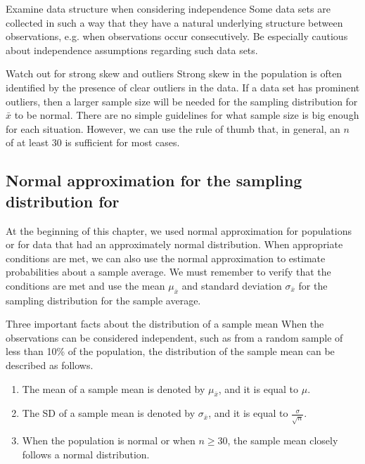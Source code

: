 \begin{onebox}{Examine data structure when considering independence}
{Some data sets are collected in such a way that they have a natural underlying structure between observations, e.g. when observations occur consecutively. Be especially cautious about independence assumptions regarding such data sets.}
\end{onebox}

\begin{onebox}{Watch out for strong skew and outliers}
{Strong skew in the population is often identified by the presence of clear outliers in the data. If a data set has prominent outliers, then a larger sample size will be needed for the sampling distribution for $\bar{x}$ to be normal. There are no simple guidelines for what sample size is big enough for each situation. However, we can use the rule of thumb that, in general, an $n$ of at least 30 is sufficient for most cases.}
\end{onebox}


\D{\newpage}

\subsection[Normal approximation for the sampling distribution for $\bar{x}$]{Normal approximation for the sampling distribution for }

At the beginning of this chapter, we used normal approximation for populations or for data that had an approximately normal distribution. When appropriate conditions are met, we can also use the normal approximation to estimate probabilities about a sample average. We must remember to verify that the conditions are met and use the mean $\mu_{\bar{x}}$ and standard deviation $\sigma_{\bar{x}}$ for the sampling distribution for the sample average.

\begin{onebox}{Three important facts about the distribution of a sample mean }
When the observations can be considered independent, such as from a random sample of less than 10\% of the population, the distribution of the sample mean can be described as follows.\begin{enumerate}
\setlength{\itemsep}{0mm}
\item The mean of a sample mean is denoted by $\mu_{\bar{x}}$, and it is equal to $\mu$.
\item The SD of a sample mean is denoted by $\sigma_{\bar{x}}$, and it is equal to $\frac{\sigma}{\sqrt{n}}$.
\item When the population is normal or when $n\ge 30$, the sample mean closely follows a normal distribution. 
\end{enumerate}\end{onebox}

